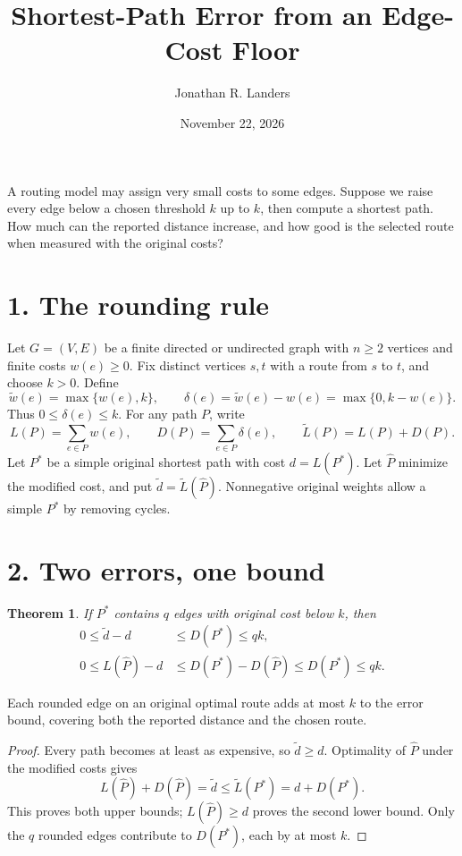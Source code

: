 \documentclass[11pt]{article}
\title{Shortest-Path Error from an Edge-Cost Floor}
\author{Jonathan R. Landers}
\date{November 22, 2026}
\newtheorem{theorem}{Theorem}
\begin{document}
\maketitle

A routing model may assign very small costs to some edges. Suppose we
raise every edge below a chosen threshold $k$ up to $k$, then compute a
shortest path. How much can the reported distance increase, and how good
is the selected route when measured with the original costs?

\section*{1. The rounding rule}
Let $G=(V,E)$ be a finite directed or undirected graph with $n\ge2$
vertices and finite costs $w(e)\ge0$. Fix distinct vertices $s,t$ with a
route from $s$ to $t$, and choose $k>0$. Define
\begin{equation}\label{eq:floor}
 \widetilde w(e)=\max\{w(e),k\},\qquad
 \delta(e)=\widetilde w(e)-w(e)=\max\{0,k-w(e)\}.
\end{equation}
Thus $0\le\delta(e)\le k$. For any path $P$, write
\[
 L(P)=\sum_{e\in P}w(e),\qquad
 D(P)=\sum_{e\in P}\delta(e),\qquad
 \widetilde L(P)=L(P)+D(P).
\]
Let $P^*$ be a simple original shortest path with cost $d=L(P^*)$.
Let $\widehat P$ minimize the modified cost, and put
$\widetilde d=\widetilde L(\widehat P)$. Nonnegative original weights
allow a simple $P^*$ by removing cycles.

\section*{2. Two errors, one bound}
\begin{theorem}
If $P^*$ contains $q$ edges with original cost below $k$, then
\begin{align}
 0\le\widetilde d-d&\le D(P^*)\le qk,\label{eq:distance}\\
 0\le L(\widehat P)-d&\le D(P^*)-D(\widehat P)\le D(P^*)\le qk.
 \label{eq:route}
\end{align}
\end{theorem}
\begin{takeaway}
Each rounded edge on an original optimal route adds at most $k$ to the
error bound, covering both the reported distance and the chosen route.
\end{takeaway}
\begin{proof}
Every path becomes at least as expensive, so $\widetilde d\ge d$.
Optimality of $\widehat P$ under the modified costs gives
\[
 L(\widehat P)+D(\widehat P)
 =\widetilde d\le\widetilde L(P^*)=d+D(P^*).
\]
This proves both upper bounds; $L(\widehat P)\ge d$ proves the second
lower bound. Only the $q$ rounded edges contribute to $D(P^*)$, each
by at most $k$.
\end{proof}
\end{document}
